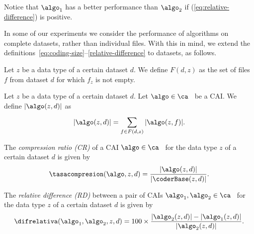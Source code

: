 Notice that $\algo_1$ has a better performance than $\algo_2$ if (\ref{eq:relative-difference}) is positive.


\vspace{+3pt}
In some of our experiments we consider the performance of algorithms on complete datasets, rather than individual files. With this in mind, we extend the definitions~\ref{eq:coding-size}--\ref{relative-difference} to datasets, as follows.


\vspace{+5pt}
\begin{defcion}
\label{eq:coding-size-dataset}
Let $z$ be a data type of a certain dataset $d$. We define $F(d, z)$ as the set of files $f$ from dataset $d$ for which $f_z$ is not empty.
\end{defcion}


\begin{defcion}
Let $z$ be a data type of a certain dataset $d$. Let $\algo \in \ca$ \ be a CAI. We define $|\algo(z, d)|$ as
\vspace{-5pt}
\begin{equation}
\label{eq:dataset-size}
|\algo(z, d)|  = \sum_{f \in F(d, z)}^{} |\algo(z, f)|.
\end{equation}
\end{defcion}


\vspace{+3pt}
\begin{defcion}
The \textit{compression ratio (CR)} of a CAI $\algo \in \ca$ \ for the data type $z$ of a certain dataset $d$ is given by
\vspace{-5pt}
\begin{equation}
\label{eq:compression-rate-dataset}
\tasacompresion(\algo, z, d) = \frac{|\algo(z, d)|}{|\coderBase(z, d)|}.
\end{equation}
\end{defcion}


\vspace{+3pt}
\begin{defcion}
\label{def:relative-difference-dataset}
The \textit{relative difference (RD)} between a pair of CAIs $\algo_1, \algo_2 \in {\ca}$ \ for the data type $z$ of a certain dataset $d$ is given by
\vspace{-5pt}
\begin{equation}
\label{eq:relative-difference-dataset}
\difrelativa(\algo_1, \algo_2, z, d)  =
100\times\frac{|\algo_2 (z, d)| - |\algo_1 (z, d)|}{ |\algo_2 (z, d)| }.
\end{equation}
\end{defcion}

